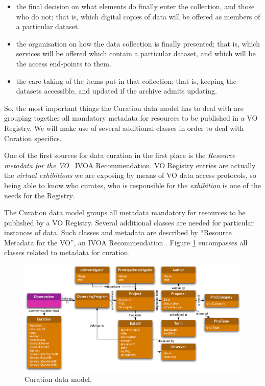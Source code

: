 		\begin{itemize}
			\item the final decision on what elements do finally
			enter the collection, and those who do not; that is,
			which digital copies of data will be offered as members
			of a particular dataset.
			
			\item the organisation on how the data collection is
			finally presented; that is, which services will be
			offered which contain a particular dataset, and which
			will be the access end-points to them.
			
			\item the care-taking of the items put in that
			collection; that is, keeping the datasets accessible,
			and updated if the archive admits updating.
		\end{itemize}
		
		So, the most important things the Curation data model has
		to deal with are grouping together all mandatory metadata for
		resources to be published in a VO Registry. We will make use
		of several additional classes in order to deal with Curation
		specifics.
		
		One of the first sources for data curation in the first
		place is the \emph{Resource metadata for the
		VO}~\cite{IVOA-Resource-Registry-WG:2007rm} IVOA
		Recommendation. VO Registry entries are actually the
		\emph{virtual exhibitions} we are exposing by means of
		VO data access protocols, so being able to know who
		curates, who is responsible for the \emph{exhibition} is
		one of the needs for the Registry. 
		
		The Curation data model groups all metadata mandatory for
		resources to be published by a VO Registry. Several
		additional classes are needed for particular instances of
		data. Such classes and metadata are described by “Resource
		Metadata for the VO”, an IVOA Recommendation
		\cite{2004ASPC..314..273H}. Figure
		\ref{figCurationDataModel} encompasses all classes related
		to metadata for curation.
		
		\begin{figure}[tbp]
			\begin{center}
				\includegraphics[width=\columnwidth]
				{fig/CurationClass.pdf}
			\end{center}
			\caption[Curation data model]{Curation data model.}
			\label{figCurationDataModel}
		\end{figure}
		
